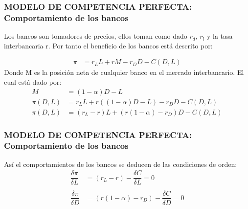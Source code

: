 \begin{frame}
    \frametitle{{\normalsize MODELO DE COMPETENCIA PERFECTA: Comportamiento de los bancos} {}}
    
    Los bancos son tomadores de precios, ellos toman como dado $r_{d}$, $r_{l}$ y la tasa interbancaria r. Por tanto el beneficio de los bancos está descrito por:
    
   \begin{align}
   \pi&=r_{L}L+rM-r_{D}D-C(D,L) \nonumber
   \end{align}    
    Donde M es la posición neta de cualquier banco en el mercado interbancario. El cual está dado por:
    \begin{align}
    M&=(1-\alpha)D-L \nonumber\\
    \pi(D,L)&=r_{L}L+r((1-\alpha)D-L)-r_{D}D-C(D,L) \nonumber \\
    \pi(D,L)&=(r_{L}-r)L+(r(1-\alpha)-r_{D})D-C(D,L) 
    \end{align} 
   
    
    
    
\end{frame}


\begin{frame}
\frametitle{{\normalsize MODELO DE COMPETENCIA PERFECTA: Comportamiento de los bancos} {}}

 
Así el comportamientos de los bancos se deducen de las condiciones de orden:
\begin{align}
\dfrac{\delta \pi}{\delta L}&=(r_{L}-r)-\dfrac{\delta C}{\delta L}=0  \nonumber \\
& \\
\dfrac{\delta \pi}{\delta D}&=(r(1-\alpha)-r_{D})-\dfrac{\delta C}{\delta D}=0  \nonumber
\end{align} 



\end{frame}


